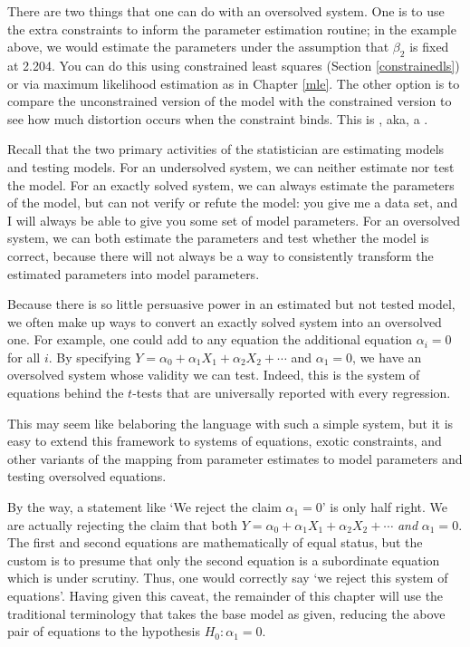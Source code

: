 There are two things that one can do with an oversolved system. One is
to use the extra constraints to inform the parameter estimation routine;
in the example above, we would estimate the parameters under the
assumption that $\beta_2$ is fixed at 2.204.
You can do this using constrained least squares (Section
\ref{constrainedls}) or via maximum likelihood estimation as in Chapter
\ref{mle}. The other option is to compare the unconstrained version of
the model with the constrained version to see how much distortion occurs
when the constraint binds. This is , aka,
a .

Recall that the two primary activities of the statistician are
estimating models and testing models. 
For an undersolved system, we can neither estimate 
nor test the model. For an exactly solved system, we can always
estimate the parameters of the model, but can not verify or refute the
model: you give me a data set, and I will always be able to give you some set of model
parameters. For an oversolved system, we can both estimate the parameters
and test whether the model is correct, because there will not always
be a way to consistently transform the estimated parameters into model
parameters.

Because there is so little persuasive power in an estimated but not
tested model, we often make up
ways to convert an exactly solved system into an oversolved one.
For example, one could add to any equation the additional equation
$\alpha_i = 0$ for all $i$.
By specifying
$Y = \alpha_0 + \alpha_1 X_1 + \alpha_2 X_2 + \cdots$ and $\alpha_1=0$,
we have an oversolved system whose validity we can test. Indeed, this
is the system of equations behind the $t$-tests that are universally
reported with every regression.

This may seem like belaboring the language with such a simple system,
but it is easy to extend this framework to systems of equations, 
exotic constraints, and other variants of the mapping from parameter
estimates to model parameters and testing oversolved equations.

By the way, a statement like `We reject
the claim $\alpha_1=0$' is only half right. We are actually rejecting
the claim that both
$Y = \alpha_0 + \alpha_1 X_1 + \alpha_2 X_2 + \cdots$ {\em and}
$\alpha_1=0$. 
The first and second equations are mathematically of equal
status, but the custom is to presume that only the second equation is a
subordinate equation which is under scrutiny. Thus, one would correctly
say `we reject this system of equations'. Having given this caveat, the
remainder of this chapter will use the traditional terminology that
takes the base model as given, reducing
the above pair of equations to the hypothesis $H_0: \alpha_1=0$.

